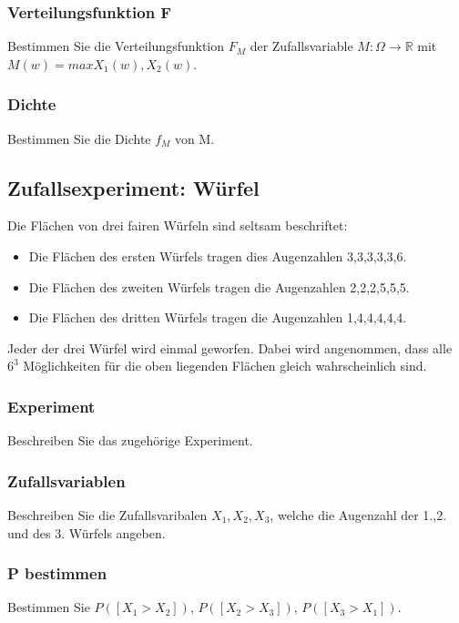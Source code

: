 \documentclass[paper=a4, fontsize=11pt]{scrartcl}
\numberwithin{equation}{section}
\numberwithin{figure}{section}
\numberwithin{table}{section}
\begin{document}
\subsubsection{Verteilungsfunktion F}
Bestimmen Sie die Verteilungsfunktion $F_{M}$ der Zufallsvariable $M: \Omega \rightarrow \mathbb{R}$ mit $M(w)=max{X_{1}(w),X_{2}(w)}$. \\

\subsubsection{Dichte}
Bestimmen Sie die Dichte $f_{M}$ von M. \\

\subsection{Zufallsexperiment: Würfel}
Die Flächen von drei fairen Würfeln sind seltsam beschriftet:
\begin{itemize}
\item Die Flächen des ersten Würfels tragen dies Augenzahlen 3,3,3,3,3,6.
\item Die Flächen des zweiten Würfels tragen die Augenzahlen 2,2,2,5,5,5.
\item Die Flächen des dritten Würfels tragen die Augenzahlen 1,4,4,4,4,4.
\end{itemize}

Jeder der drei Würfel wird einmal geworfen. Dabei wird angenommen, dass alle $6^{3}$ Möglichkeiten für die oben liegenden Flächen gleich wahrscheinlich sind. \\

\subsubsection{Experiment}
Beschreiben Sie das zugehörige Experiment. \\

\subsubsection{Zufallsvariablen}
Beschreiben Sie die Zufallsvaribalen $X_{1},X_{2},X_{3}$, welche die Augenzahl der 1.,2. und des 3. Würfels angeben. \\

\subsubsection{P bestimmen}
Bestimmen Sie $P([X_{1} > X_{2}])$, $P([X_{2} > X_{3}])$, $P([X_{3} > X_{1}])$. \\
\end{document}
